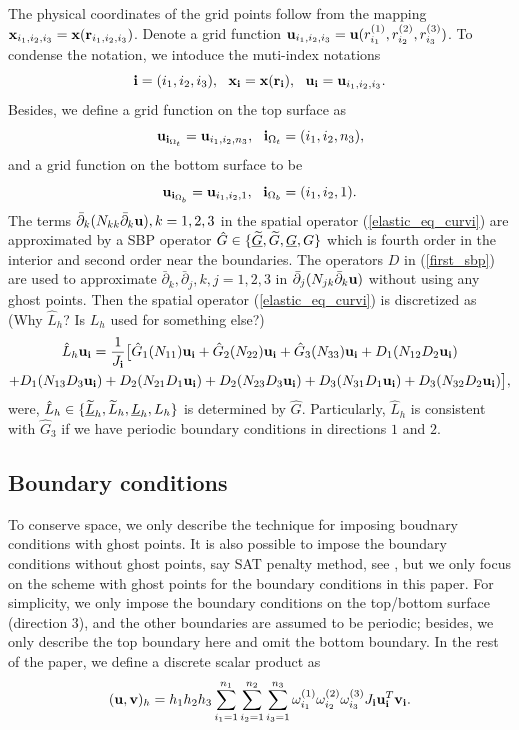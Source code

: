 \documentclass[a4paper]{article}
\newcommand{\wt}{\widetilde}
\begin{document}
The physical coordinates of the grid points follow from the mapping ${\bf x}_{i_1,i_2,i_3} = {\bf x}({\bf r}_{i_1,i_2,i_3})$. Denote a grid function ${\bf u}_{i_1,i_2,i_3} = {\bf u}(r_{i_1}^{(1)},r_{i_2}^{(2)},r_{i_3}^{(3)})$. To condense the notation, we intoduce the muti-index notations
\[{\bf i} = (i_1,i_2,i_3),\ \ {\bf x}_{\bf i} = {\bf x}({\bf r}_{\bf i}),\ \ {\bf u}_{\bf i} = {\bf u}_{i_1,i_2,i_3}.\]
Besides, we define a grid function on the top surface as
\[{\bf u}_{{\bf i}_{\Omega_t}} = {\bf u}_{i_1,i_2,n_3}, \ \ {\bf i}_{\Omega_t} = (i_1,i_2,n_3),\]
and a grid function on the bottom surface to be
\[{\bf u}_{{\bf i}_{\Omega_b}} = {\bf u}_{i_1,i_2,1}, \ \ {\bf i}_{\Omega_b} = (i_1,i_2,1).\]
The terms $\bar{\partial}_k(N_{kk}\bar{\partial}_k{\bf u}), k = 1,2,3$ in the spatial operator (\ref{elastic_eq_curvi}) are approximated by a SBP operator $\hat{G}\in\{\uline{\wt G}, \wt{G}, \uline{G}, G\}$ which is fourth order in the interior and  second order near the boundaries. The operators $D$ in  (\ref{first_sbp}) are used to approximate  $\bar{\partial}_k, \bar{\partial}_j, k,j = 1,2,3$ in $\bar{\partial}_j(N_{jk}\bar{\partial}_k{\bf u})$ without using any ghost points. Then the spatial operator (\ref{elastic_eq_curvi}) is discretized as {\color{red} (Why $\hat{ L}_h$? Is $L_h$ used for something else?)}
\begin{multline}\label{discrete_elastic}
\hat{ L}_h{\bf u}_{\bf i} = \frac{1}{J_{\bf i}}\big[\hat{G}_1(N_{11}){\bf u}_{\bf i}+\hat{G}_2(N_{22}){\bf u}_{\bf i}+\hat{G}_3(N_{33}){\bf u}_{\bf i}+D_1(N_{12}D_2{\bf u}_{\bf i})\\
+D_1(N_{13}D_3{\bf u}_{\bf i})+D_2(N_{21}D_1{\bf u}_{\bf i})+D_2(N_{23}D_3{\bf u}_{\bf i})+D_3(N_{31}D_1{\bf u}_{\bf i})
+D_3(N_{32}D_2{\bf u}_{\bf i})\big],
\end{multline}
{\color{blue} were, $\hat{L}_h\in\{\uline{\wt L}_h, \wt{L}_h, \uline{L}_h,L_h\}$ is determined by $\hat{G}$. Particularly, $\hat{L}_h$ is consistent with $\hat{G}_3$ if we have periodic boundary conditions in directions $1$ and $2$.}
 
\subsection{Boundary conditions}\label{boundary_conditions}
To conserve space, we only describe the technique for imposing boudnary conditions with ghost points. It is also possible to impose the boundary conditions without ghost points, say SAT penalty method, see \cite{?}, but we only focus on the scheme with ghost points for the boundary conditions in this paper. For simplicity, we only impose the boundary conditions on the top/bottom surface (direction $3$), and the other boundaries are assumed to be periodic; besides, we only describe the top boundary here and omit the bottom boundary. In the rest of the paper, we define a discrete scalar product as
\begin{equation}\label{scalar_product_discrete_interior}
({\bf u}, {\bf v})_h = h_1h_2h_3\sum_{i_1=1}^{n_1}\sum_{i_2=1}^{n_2}\sum_{i_3=1}^{n_3}\omega_{i_1}^{(1)}\omega_{i_2}^{(2)}\omega_{i_3}^{(3)}J_{\bf i}{\bf u}^{T}_{\bf i}{\bf v}_{\bf i}.
\end{equation}
\end{document}
